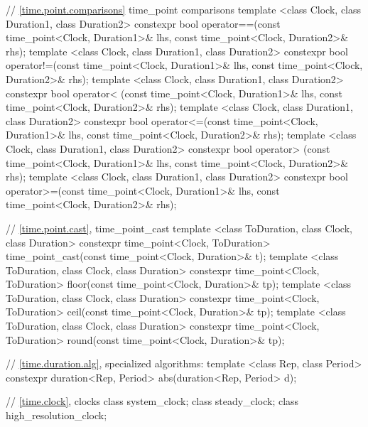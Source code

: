 \begin{codeblock}
{{    // \ref{time.point.comparisons} time_point comparisons
    template <class Clock, class Duration1, class Duration2>
       constexpr bool operator==(const time_point<Clock, Duration1>& lhs,
                                 const time_point<Clock, Duration2>& rhs);
    template <class Clock, class Duration1, class Duration2>
       constexpr bool operator!=(const time_point<Clock, Duration1>& lhs,
                                 const time_point<Clock, Duration2>& rhs);
    template <class Clock, class Duration1, class Duration2>
       constexpr bool operator< (const time_point<Clock, Duration1>& lhs,
                                 const time_point<Clock, Duration2>& rhs);
    template <class Clock, class Duration1, class Duration2>
       constexpr bool operator<=(const time_point<Clock, Duration1>& lhs,
                                 const time_point<Clock, Duration2>& rhs);
    template <class Clock, class Duration1, class Duration2>
       constexpr bool operator> (const time_point<Clock, Duration1>& lhs,
                                 const time_point<Clock, Duration2>& rhs);
    template <class Clock, class Duration1, class Duration2>
       constexpr bool operator>=(const time_point<Clock, Duration1>& lhs,
                                 const time_point<Clock, Duration2>& rhs);

    // \ref{time.point.cast}, time_point_cast
    template <class ToDuration, class Clock, class Duration>
      constexpr time_point<Clock, ToDuration>
      time_point_cast(const time_point<Clock, Duration>& t);
    template <class ToDuration, class Clock, class Duration>
      constexpr time_point<Clock, ToDuration>
      floor(const time_point<Clock, Duration>& tp);
    template <class ToDuration, class Clock, class Duration>
      constexpr time_point<Clock, ToDuration>
      ceil(const time_point<Clock, Duration>& tp);
    template <class ToDuration, class Clock, class Duration>
      constexpr time_point<Clock, ToDuration>
      round(const time_point<Clock, Duration>& tp);

    // \ref{time.duration.alg}, specialized algorithms:
    template <class Rep, class Period>
      constexpr duration<Rep, Period> abs(duration<Rep, Period> d);

    // \ref{time.clock}, clocks
    class system_clock;
    class steady_clock;
    class high_resolution_clock;
  }

}
\end{codeblock}
